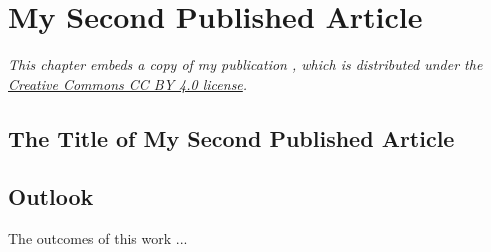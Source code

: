 \chapter{My Second Published Article} \label{chap:article2}
\begin{displayquote} \emph{%
	This chapter embeds a copy of my publication \cite{example5}, which is distributed under the \href{https://creativecommons.org/licenses/by/4.0/}{Creative Commons CC BY 4.0 license}.
} \end{displayquote}




\section{The Title of My Second Published Article}




\section{Outlook}
The outcomes of this work ...


